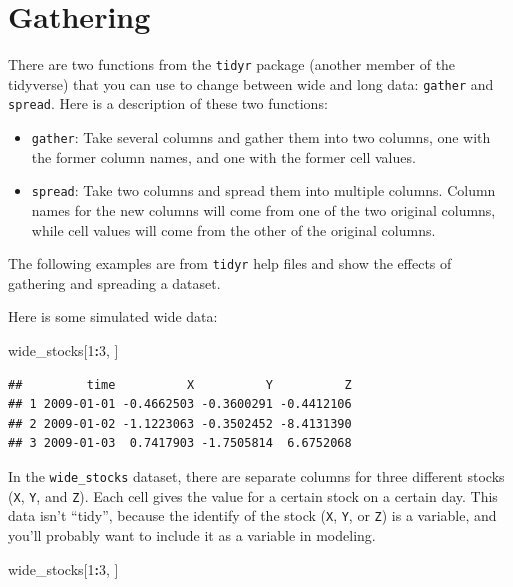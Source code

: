 \documentclass[]{book}
\makeatletter
\newenvironment{Shaded}{\begin{snugshade}}{\end{snugshade}}
\newcommand{\DecValTok}[1]{\textcolor[rgb]{0.00,0.00,0.81}{#1}}
\newcommand{\OperatorTok}[1]{\textcolor[rgb]{0.81,0.36,0.00}{\textbf{#1}}}
\newcommand{\NormalTok}[1]{#1}
\providecommand{\tightlist}{%
  \setlength{\itemsep}{0pt}\setlength{\parskip}{0pt}}
\newenvironment{kframe}{%
\medskip{}
\setlength{\fboxsep}{.8em}
 \def\at@end@of@kframe{}%
 \ifinner\ifhmode%
  \def\at@end@of@kframe{\end{minipage}}%
  \begin{minipage}{\columnwidth}%
 \fi\fi%
 \def\FrameCommand##1{\hskip\@totalleftmargin \hskip-\fboxsep
 \colorbox{shadecolor}{##1}\hskip-\fboxsep
     \hskip-\linewidth \hskip-\@totalleftmargin \hskip\columnwidth}%
 \MakeFramed {\advance\hsize-\width
   \@totalleftmargin\z@ \linewidth\hsize
   \@setminipage}}%
 {\par\unskip\endMakeFramed%
 \at@end@of@kframe}
\renewenvironment{Shaded}{\begin{kframe}}{\end{kframe}}
\theoremstyle{definition}
\theoremstyle{definition}
\theoremstyle{definition}
\theoremstyle{remark}
\makeatother
\begin{document}
\section{Gathering}\label{gathering}

There are two functions from the \texttt{tidyr} package (another member
of the tidyverse) that you can use to change between wide and long data:
\texttt{gather} and \texttt{spread}. Here is a description of these two
functions:

\begin{itemize}
\tightlist
\item
  \texttt{gather}: Take several columns and gather them into two
  columns, one with the former column names, and one with the former
  cell values.
\item
  \texttt{spread}: Take two columns and spread them into multiple
  columns. Column names for the new columns will come from one of the
  two original columns, while cell values will come from the other of
  the original columns.
\end{itemize}

The following examples are from \texttt{tidyr} help files and show the
effects of gathering and spreading a dataset.

Here is some simulated wide data:

\begin{Shaded}
\begin{Highlighting}[]
\NormalTok{wide_stocks[}\DecValTok{1}\OperatorTok{:}\DecValTok{3}\NormalTok{, ]}
\end{Highlighting}
\end{Shaded}

\begin{verbatim}
##         time          X          Y          Z
## 1 2009-01-01 -0.4662503 -0.3600291 -0.4412106
## 2 2009-01-02 -1.1223063 -0.3502452 -8.4131390
## 3 2009-01-03  0.7417903 -1.7505814  6.6752068
\end{verbatim}

In the \texttt{wide\_stocks} dataset, there are separate columns for
three different stocks (\texttt{X}, \texttt{Y}, and \texttt{Z}). Each
cell gives the value for a certain stock on a certain day. This data
isn't ``tidy'', because the identify of the stock (\texttt{X},
\texttt{Y}, or \texttt{Z}) is a variable, and you'll probably want to
include it as a variable in modeling.

\begin{Shaded}
\begin{Highlighting}[]
\NormalTok{wide_stocks[}\DecValTok{1}\OperatorTok{:}\DecValTok{3}\NormalTok{, ]}
\end{Highlighting}
\end{Shaded}
\end{document}
